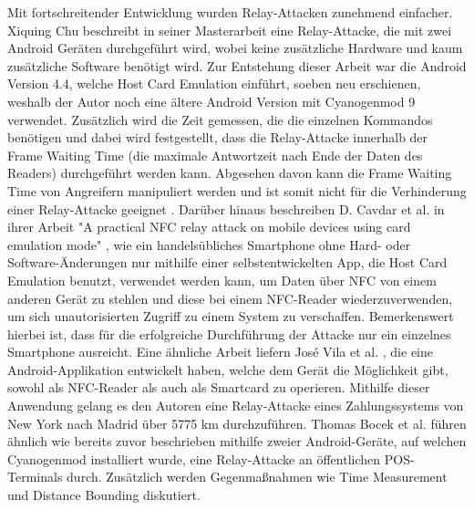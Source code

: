 \documentclass[a4paper,10pt,ngerman]{INSOexpose}
\begin{document}
{	Mit fortschreitender Entwicklung wurden Relay-Attacken zunehmend einfacher. Xiquing Chu beschreibt in seiner Masterarbeit \cite{relayAttackOfNfcSmartCards} eine Relay-Attacke, die mit zwei Android Geräten durchgeführt wird, wobei keine zusätzliche Hardware und kaum zusätzliche Software benötigt wird. Zur Entstehung dieser Arbeit war die Android Version 4.4, welche Host Card Emulation einführt, soeben neu erschienen, weshalb der Autor noch eine ältere Android Version mit Cyanogenmod 9 verwendet. Zusätzlich wird die Zeit gemessen, die die einzelnen Kommandos benötigen und dabei wird festgestellt, dass die Relay-Attacke innerhalb der Frame Waiting Time (die maximale Antwortzeit nach Ende der Daten des Readers) \cite{practicalNfcAttackmobileDevices} durchgeführt werden kann. Abgesehen davon kann die Frame Waiting Time von Angreifern manipuliert werden und ist somit nicht für die Verhinderung einer Relay-Attacke geeignet \cite{practicalNfcAttackmobileDevices}.
	\newline
	Darüber hinaus beschreiben D. Cavdar et al. in ihrer Arbeit "A practical NFC relay attack on mobile devices using card emulation mode" \cite{practicalNfcAttackmobileDevices}, wie ein handelsübliches Smartphone ohne Hard- oder Software-Änderungen nur mithilfe einer selbstentwickelten App, die Host Card Emulation benutzt, verwendet werden kann, um Daten über NFC von einem anderen Gerät zu stehlen und diese bei einem NFC-Reader wiederzuverwenden, um sich unautorisierten Zugriff zu einem System zu verschaffen. Bemerkenswert hierbei ist, dass für die erfolgreiche Durchführung der Attacke nur ein einzelnes Smartphone ausreicht.
	\newline
	Eine ähnliche Arbeit liefern Jos\'{e} Vila et al. \cite{practicalExperiencesNfcRelayAndroid}, die eine Android-Applikation entwickelt haben, welche dem Gerät die Möglichkeit gibt, sowohl als NFC-Reader als auch als Smartcard zu operieren. Mithilfe dieser Anwendung gelang es den Autoren eine Relay-Attacke eines Zahlungssystems von New York nach Madrid über 5775 km durchzuführen. 
	\newline
	Thomas Bocek et al. \cite{nfcRelayWithOffTheShelfHardAndSoftware} führen ähnlich wie bereits zuvor beschrieben mithilfe zweier Android-Geräte, auf welchen Cyanogenmod installiert wurde, eine Relay-Attacke an öffentlichen POS-Terminals durch. Zusätzlich werden Gegenmaßnahmen wie Time Measurement und Distance Bounding diskutiert. 
}

\section{}
\end{document}
